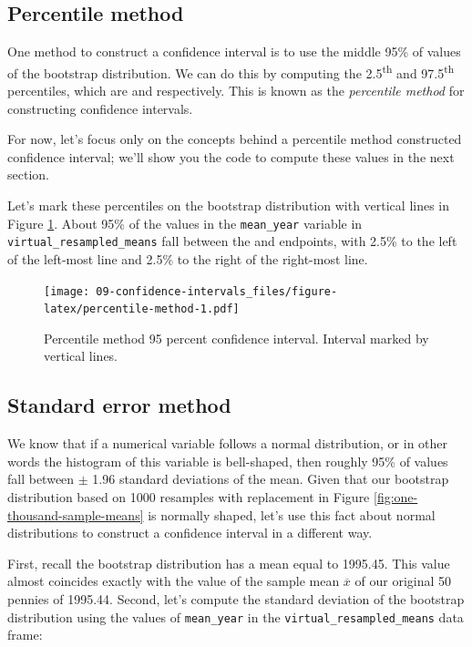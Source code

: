 \documentclass[
]{book}
\begin{document}
\hypertarget{percentile-method}{%
\subsection{Percentile method}\label{percentile-method}}

One method to construct a confidence interval is to use the middle 95\% of values of the bootstrap distribution. We can do this by computing the 2.5\textsuperscript{th} and 97.5\textsuperscript{th} percentiles, which are and respectively. This is known as the \emph{percentile method} for constructing confidence intervals.

For now, let's focus only on the concepts behind a percentile method constructed confidence interval; we'll show you the code to compute these values in the next section.

Let's mark these percentiles on the bootstrap distribution with vertical lines in Figure \ref{fig:percentile-method}. About 95\% of the values in the \texttt{mean\_year} variable in \texttt{virtual\_resampled\_means} fall between the and endpoints, with 2.5\% to the left of the left-most line and 2.5\% to the right of the right-most line.

\begin{figure}
\centering
\texttt{[image: 09-confidence-intervals\_files/figure-latex/percentile-method-1.pdf]}
\caption{\label{fig:percentile-method}Percentile method 95 percent confidence interval. Interval marked by vertical lines.}
\end{figure}

\hypertarget{se-method}{%
\subsection{Standard error method}\label{se-method}}

We know that if a numerical variable follows a normal distribution, or in other words the histogram of this variable is bell-shaped, then roughly 95\% of values fall between \(\pm\) 1.96 standard deviations of the mean. Given that our bootstrap distribution based on 1000 resamples with replacement in Figure \ref{fig:one-thousand-sample-means} is normally shaped, let's use this fact about normal distributions to construct a confidence interval in a different way.

First, recall the bootstrap distribution has a mean equal to 1995.45. This value almost coincides exactly with the value of the sample mean \(\overline{x}\) of our original 50 pennies of 1995.44. Second, let's compute the standard deviation of the bootstrap distribution using the values of \texttt{mean\_year} in the \texttt{virtual\_resampled\_means} data frame:
\end{document}
